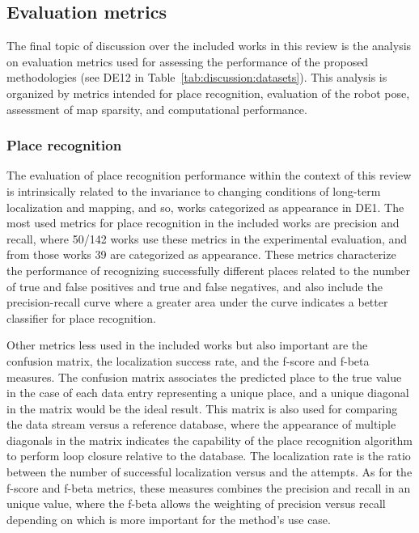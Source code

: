 \subsection{Evaluation metrics}
\label{sec:discussion:metrics}

The final topic of discussion over the included works in this review is the analysis on evaluation metrics used for assessing the performance of the proposed methodologies (see DE12 in Table~\ref{tab:discussion:datasets}).
This analysis is organized by metrics intended for place recognition, evaluation of the robot pose, assessment of map sparsity, and computational performance.



\subsubsection{Place recognition}

The evaluation of place recognition performance within the context of this review is intrinsically related to the invariance to changing conditions of long-term localization and mapping, and so, works categorized as appearance in DE1. The most used metrics for place recognition in the included works are precision and recall, where 50/142 works use these metrics in the experimental evaluation, and from those works 39 are categorized as appearance. These metrics characterize the performance of recognizing successfully different places related to the number of true and false positives and true and false negatives, and also include the precision-recall curve where a greater area under the curve indicates a better classifier for place recognition.

Other metrics less used in the included works but also important are the confusion matrix, the localization success rate, and the f-score and f-beta measures. The confusion matrix associates the predicted place to the true value in the case of each data entry representing a unique place, and a unique diagonal in the matrix would be the ideal result. This matrix is also used for comparing the data stream versus a reference database, where the appearance of multiple diagonals in the matrix indicates the capability of the place recognition algorithm to perform loop closure relative to the database.
The localization rate is the ratio between the number of successful localization versus and the attempts. As for the f-score and f-beta metrics, these measures combines the precision and recall in an unique value, where the f-beta allows the weighting of precision versus recall depending on which is more important for the method's use case.



